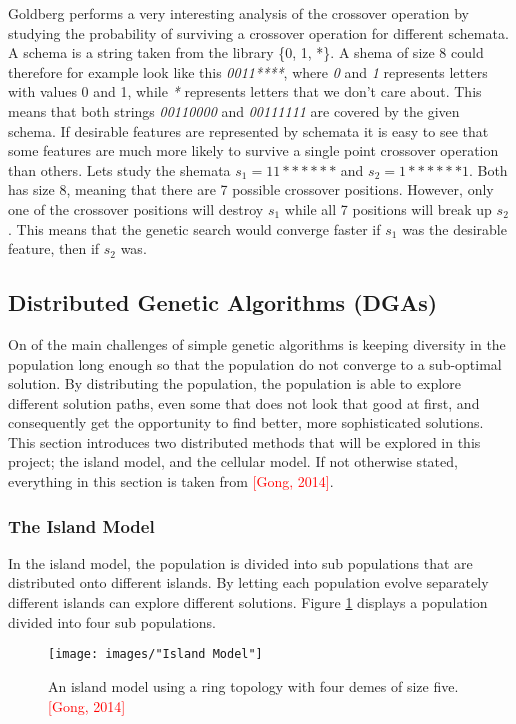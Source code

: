 \noindent Goldberg performs a very interesting analysis of the crossover operation by studying the probability of surviving a crossover operation for different schemata. A schema is a string taken from the library \{0, 1, *\}.  A shema of size 8 could therefore for example look like this \textit{0011****}, where \textit{0} and \textit{1} represents letters with values 0 and 1, while \textit{*} represents letters that we don't care about. This means that both strings \textit{00110000} and \textit{00111111} are covered by the given schema. If desirable features are represented by schemata it is easy to see that some features are much more likely to survive a single point crossover operation than others. Lets study the shemata $s_1 = 11******$ and $s_2  = 1******1$. Both has size 8, meaning that there are 7 possible crossover positions. However, only one of the crossover positions will destroy $s_1$ while all 7 positions will break up $s_2$. This means that the genetic search would converge faster if $s_1$ was the desirable feature, then if $s_2$ was.


\subsection{Distributed Genetic Algorithms (DGAs)}
On of the main challenges of simple genetic algorithms is keeping diversity in the population long enough so that the population do not converge to a sub-optimal solution. By distributing the population, the population is able to explore different solution paths, even some that does not look that good at first, and consequently get the opportunity to find better, more sophisticated solutions. This section introduces two distributed methods that will be explored in this project; the island model, and the cellular model. If not otherwise stated, everything in this section is taken from \textcolor{red}{[Gong, 2014]}.


\subsubsection{The Island Model}
In the island model, the population is divided into sub populations that are distributed onto different islands. By letting each population evolve separately different islands can explore different solutions. Figure \ref{Island model} displays a population divided into four sub populations. \\ 


\begin{figure}[h!]
\begin{center}
\texttt{[image: images/"Island Model"]}
\caption{An island model using a ring topology with four demes of size five. \textcolor{red}{[Gong, 2014]}}
\label{Island model}
\end{center}
\end{figure}



